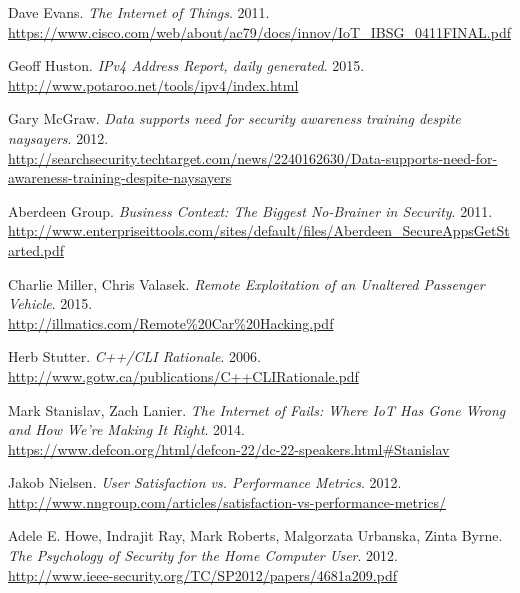 \documentclass[a4paper,12pt]{article}
\begin{document}
	\begingroup
	\renewcommand{\section}[2]{}
	\begin{thebibliography}{}
		
		Dave Evans. \textit{The Internet of Things}. 2011.\\ \url{https://www.cisco.com/web/about/ac79/docs/innov/IoT\_IBSG\_0411FINAL.pdf}
		
		Geoff Huston. \textit{IPv4 Address Report, daily generated}. 2015.\\
		\url{http://www.potaroo.net/tools/ipv4/index.html}
		
		Gary McGraw. \textit{Data supports need for security awareness training despite naysayers}. 2012.\\
		\url{http://searchsecurity.techtarget.com/news/2240162630/Data-supports-need-for-awareness-training-despite-naysayers}
		
		Aberdeen Group. \textit{Business Context: The Biggest No-Brainer in Security}. 2011.\\
		\url{http://www.enterpriseittools.com/sites/default/files/Aberdeen_SecureAppsGetStarted.pdf}
		
		Charlie Miller, Chris Valasek. \textit{Remote Exploitation of an Unaltered Passenger Vehicle}. 2015.\\
		\url{http://illmatics.com/Remote%20Car%20Hacking.pdf}
		
		Herb Stutter. \textit{C++/CLI Rationale}. 2006.\\
		\url{http://www.gotw.ca/publications/C++CLIRationale.pdf}
		
		Mark Stanislav, Zach Lanier. \textit{The Internet of Fails: Where IoT Has Gone Wrong and How We're Making It Right}. 2014.\\
		\url{https://www.defcon.org/html/defcon-22/dc-22-speakers.html#Stanislav}
		
		Jakob Nielsen. \textit{User Satisfaction vs. Performance Metrics}. 2012.\\
		\url{http://www.nngroup.com/articles/satisfaction-vs-performance-metrics/}
		
		Adele E. Howe, Indrajit Ray, Mark Roberts, Malgorzata Urbanska, Zinta Byrne. \textit{The Psychology of Security for the Home Computer User}. 2012.\\
		\url{http://www.ieee-security.org/TC/SP2012/papers/4681a209.pdf}
		

\end{thebibliography}
\end{document}
